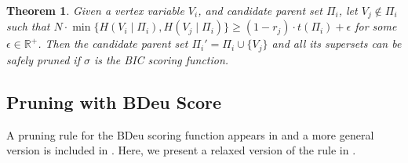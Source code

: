 \documentclass[letterpaper]{article}
\newtheorem{theorem}{Theorem}
\newtheorem{lemma}{Lemma}
\begin{document}



\begin{theorem}
Given a vertex variable $V_i$, and candidate parent set $\Pi_i$, let $V_j \notin \Pi_i$  such that $N \cdot \min \{H(V_i \mid \Pi_i), H(V_j \mid \Pi_i)\} \geq (1 - r_{j}) \cdot t(\Pi_i) +\epsilon$ for some $\epsilon \in \mathbb{R}^+$. Then the candidate parent set $\Pi_i' = \Pi_i \cup \{V_j \}$ and all its supersets can be safely pruned if $\sigma$ is the BIC scoring function.
\end{theorem}

\subsection{Pruning with BDeu Score}

A pruning rule for the BDeu scoring function appears in \cite{Campos2017} and a more general version is included in \cite{cussens2015gobnilp}. Here, we present a relaxed version of the rule in \cite{cussens2015gobnilp}.

\end{document}
